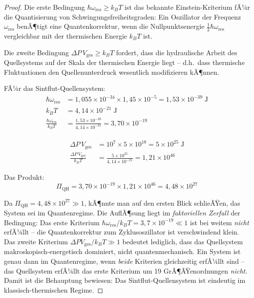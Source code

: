 ﻿\documentclass[12pt,a4paper]{report}
\begin{document}
\begin{proof}
	Die erste Bedingung $\hbar\omega_\mathrm{res} \geq k_BT$ ist das bekannte Einstein-Kriterium fÃ¼r die Quantisierung von Schwingungsfreiheitsgraden: Ein Oszillator der Frequenz $\omega_\mathrm{res}$ benÃ¶tigt eine Quantenkorrektur, wenn die Nullpunktsenergie $\frac{1}{2}\hbar\omega_\mathrm{res}$ vergleichbar mit der thermischen Energie $k_BT$ ist.
	
	Die zweite Bedingung $\Delta P\,V_\mathrm{ges} \geq k_BT$ fordert, dass die hydraulische Arbeit des Quellsystems auf der Skala der thermischen Energie liegt -- d.h.\ dass thermische Fluktuationen den Quellenunterdruck wesentlich modifizieren kÃ¶nnen.
	
	FÃ¼r das Sintflut-Quellensystem:
	\begin{align}
		\hbar\omega_\mathrm{res} &= 1{,}055\times10^{-34}\times1{,}45\times10^{-5} = 1{,}53\times10^{-39}\;\text{J} \\
		k_BT &= 4{,}14\times10^{-21}\;\text{J} \\
		\frac{\hbar\omega_\mathrm{res}}{k_BT} &= \frac{1{,}53\times10^{-39}}{4{,}14\times10^{-21}} = 3{,}70\times10^{-19} \label{eq:einstein_kriterium_sintflut}
	\end{align}
	
	\begin{align}
		\Delta P\,V_\mathrm{ges} &= 10^7\times5\times10^{18} = 5\times10^{25}\;\text{J} \\
		\frac{\Delta P\,V_\mathrm{ges}}{k_BT} &= \frac{5\times10^{25}}{4{,}14\times10^{-21}} = 1{,}21\times10^{46} \label{eq:hydraulik_kriterium_sintflut}
	\end{align}
	
	Das Produkt:
	\begin{equation}
		\Pi_\mathrm{QH} = 3{,}70\times10^{-19}\times1{,}21\times10^{46} = 4{,}48\times10^{27}
		\label{eq:pi_qh_numerisch}
	\end{equation}
	
	Da $\Pi_\mathrm{QH} = 4{,}48\times10^{27} \gg 1$, kÃ¶nnte man auf den ersten Blick schlieÃŸen, das System sei im Quantenregime. Die AuflÃ¶sung liegt im \textit{faktoriellen Zerfall} der Bedingung: Das erste Kriterium $\hbar\omega_\mathrm{res}/k_BT = 3{,}7\times10^{-19} \ll 1$ ist bei weitem \textit{nicht} erfÃ¼llt -- die Quantenkorrektur zum Zyklusoszillator ist verschwindend klein. Das zweite Kriterium $\Delta P V_\mathrm{ges}/k_BT \gg 1$ bedeutet lediglich, dass das Quellsystem makroskopisch-energetisch dominiert, nicht quantenmechanisch. Ein System ist genau dann im Quantenregime, wenn \textit{beide} Kriterien gleichzeitig erfÃ¼llt sind -- das Quellsystem erfÃ¼llt das erste Kriterium um 19 GrÃ¶ÃŸenordnungen \textit{nicht}. Damit ist die Behauptung bewiesen: Das Sintflut-Quellensystem ist eindeutig im klassisch-thermischen Regime.
\end{proof}
\end{document}
